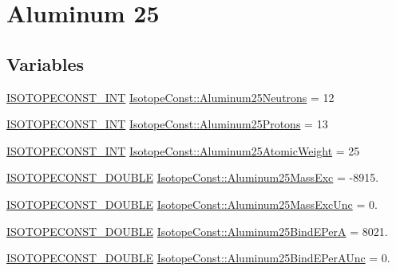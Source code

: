 \hypertarget{group___isotope_const-_aluminum-_al25}{}\section{Aluminum 25}
\label{group___isotope_const-_aluminum-_al25}
\subsection*{Variables}
\begin{DoxyCompactItemize}
\item 
\mbox{\hyperlink{group___isotope_const-_macros_ga5f18360b3e99483a35c32d789e62621c}{I\+S\+O\+T\+O\+P\+E\+C\+O\+N\+S\+T\+\_\+\+I\+NT}} \mbox{\hyperlink{group___isotope_const-_aluminum-_al25_ga9874591d230f31ceb8ca47f43e6849d2}{Isotope\+Const\+::\+Aluminum25\+Neutrons}} = 12
\item 
\mbox{\hyperlink{group___isotope_const-_macros_ga5f18360b3e99483a35c32d789e62621c}{I\+S\+O\+T\+O\+P\+E\+C\+O\+N\+S\+T\+\_\+\+I\+NT}} \mbox{\hyperlink{group___isotope_const-_aluminum-_al25_gaefd094775d7f6441df7e4a4d0bd28e03}{Isotope\+Const\+::\+Aluminum25\+Protons}} = 13
\item 
\mbox{\hyperlink{group___isotope_const-_macros_ga5f18360b3e99483a35c32d789e62621c}{I\+S\+O\+T\+O\+P\+E\+C\+O\+N\+S\+T\+\_\+\+I\+NT}} \mbox{\hyperlink{group___isotope_const-_aluminum-_al25_ga8583b9885429ed832b16cb10f8424758}{Isotope\+Const\+::\+Aluminum25\+Atomic\+Weight}} = 25
\item 
\mbox{\hyperlink{group___isotope_const-_macros_ga8f45a7272ce02c0b4c65c44636ed719a}{I\+S\+O\+T\+O\+P\+E\+C\+O\+N\+S\+T\+\_\+\+D\+O\+U\+B\+LE}} \mbox{\hyperlink{group___isotope_const-_aluminum-_al25_ga2b90cf3130bdef737dad092cfc2370bb}{Isotope\+Const\+::\+Aluminum25\+Mass\+Exc}} = -\/8915.
\item 
\mbox{\hyperlink{group___isotope_const-_macros_ga8f45a7272ce02c0b4c65c44636ed719a}{I\+S\+O\+T\+O\+P\+E\+C\+O\+N\+S\+T\+\_\+\+D\+O\+U\+B\+LE}} \mbox{\hyperlink{group___isotope_const-_aluminum-_al25_ga259fb87eb2e17c267b2c95d37c6ce968}{Isotope\+Const\+::\+Aluminum25\+Mass\+Exc\+Unc}} = 0.
\item 
\mbox{\hyperlink{group___isotope_const-_macros_ga8f45a7272ce02c0b4c65c44636ed719a}{I\+S\+O\+T\+O\+P\+E\+C\+O\+N\+S\+T\+\_\+\+D\+O\+U\+B\+LE}} \mbox{\hyperlink{group___isotope_const-_aluminum-_al25_ga2e1e56850a150af33fe2d6a21eaaa5f5}{Isotope\+Const\+::\+Aluminum25\+Bind\+E\+PerA}} = 8021.
\item 
\mbox{\hyperlink{group___isotope_const-_macros_ga8f45a7272ce02c0b4c65c44636ed719a}{I\+S\+O\+T\+O\+P\+E\+C\+O\+N\+S\+T\+\_\+\+D\+O\+U\+B\+LE}} \mbox{\hyperlink{group___isotope_const-_aluminum-_al25_ga8e051ba8ceed6ddc571f1d2279c70330}{Isotope\+Const\+::\+Aluminum25\+Bind\+E\+Per\+A\+Unc}} = 0.

\end{DoxyCompactItemize}
